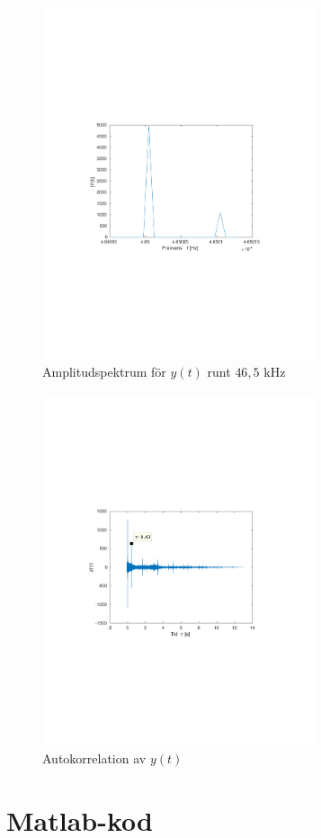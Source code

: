 \documentclass[10pt,twocolumn]{article}
\begin{document}
\section*{ }
\begin{figure}[H]
\includegraphics[trim={3.8cm 8cm 4.8cm 9cm},clip,width=8cm]{Y_46_5kHz.pdf}
\caption{Amplitudspektrum för $y(t)$ runt $46{,}5$ kHz}
\end{figure}

\begin{figure}[H]
\includegraphics[trim={3.8cm 8cm 4.8cm 9cm},clip,width=8cm]{xcorr.pdf}
\caption{Autokorrelation av $y(t)$}
\end{figure}

\clearpage

\section*{Matlab-kod}
\small
\texttt{}
\end{document}
